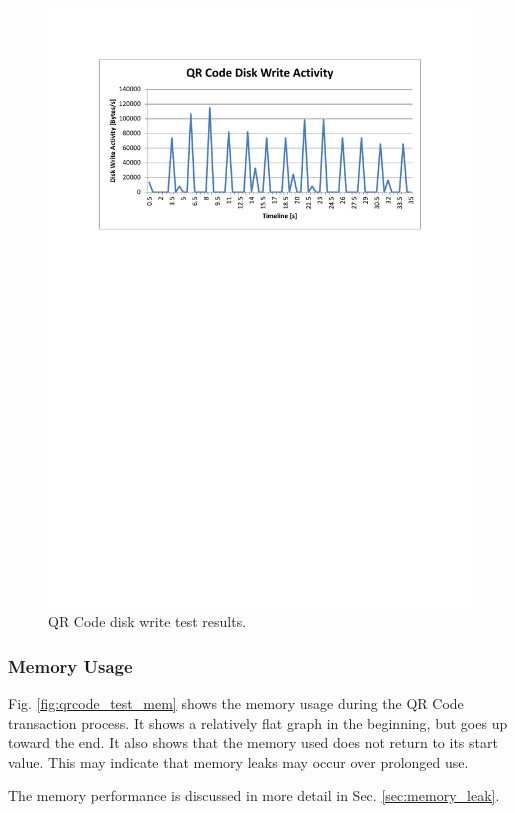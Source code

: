 \begin{figure}
 \centering 
 \includegraphics[clip=true, trim = 0 530 0 70,
 scale=0.7]{qrcode_test_disk}
 \caption{QR Code disk write test results.}
 \label{fig:qrcode_test_disk}
\end{figure}

\subsubsection{Memory Usage}

Fig. \ref{fig:qrcode_test_mem} shows the memory usage during the QR Code transaction
process. It shows a relatively flat graph in the beginning, but goes up toward the end. 
It also shows that the memory used does not return to its start value. This may indicate
that memory leaks may occur over prolonged use.

The memory performance is discussed in more detail in Sec. \ref{sec:memory_leak}.

